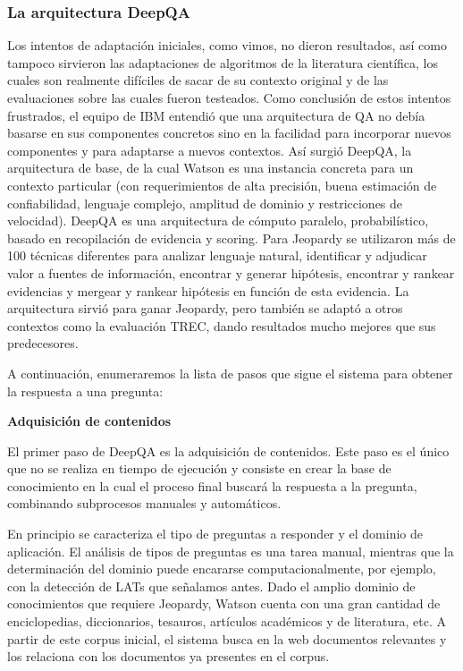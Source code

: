 \subsubsection*{La arquitectura DeepQA}
\label{subsec:deep-qa}
Los intentos de adaptación iniciales, como vimos, no dieron resultados, así como tampoco sirvieron las adaptaciones de algoritmos de la literatura científica, los cuales son realmente difíciles de
sacar de su contexto original y de las evaluaciones sobre las cuales fueron testeados. Como conclusión de estos intentos frustrados, el equipo de IBM entendió que una arquitectura de QA no debía basarse en sus componentes concretos sino en la facilidad para incorporar nuevos componentes y para adaptarse a nuevos contextos. Así surgió DeepQA, la arquitectura de base, de la cual Watson es una instancia concreta para un contexto particular (con requerimientos de alta precisión, buena estimación de confiabilidad, lenguaje complejo, amplitud de dominio y restricciones de velocidad). DeepQA es una arquitectura de cómputo paralelo, probabilístico, basado en recopilación de evidencia y scoring. Para Jeopardy se utilizaron más de 100 técnicas diferentes para analizar lenguaje natural, identificar y adjudicar valor a fuentes de información, encontrar y generar hipótesis, encontrar y rankear evidencias y mergear y rankear hipótesis en función de esta evidencia. La arquitectura sirvió para ganar Jeopardy, pero también se adaptó a otros contextos como la evaluación TREC, dando resultados mucho mejores que sus predecesores. 
\medskip

A continuación, enumeraremos la lista de pasos que sigue el sistema para obtener la respuesta a una pregunta: \newline

\textbf{Adquisición de contenidos} \newline

El primer paso de DeepQA es la adquisición de contenidos. Este paso es
el único que no se realiza en tiempo de ejecución y consiste en
crear la base de conocimiento en la cual el proceso final buscará la
respuesta a la pregunta, combinando subprocesos manuales y
automáticos. 

En principio se caracteriza el tipo de preguntas a responder y el
dominio de aplicación. El análisis de tipos de preguntas es una
tarea manual, mientras que la determinación del dominio puede
encararse computacionalmente, por ejemplo, con la detección de LATs
que señalamos antes. Dado el amplio dominio de conocimientos que
requiere Jeopardy, Watson cuenta con una gran cantidad de
enciclopedias, diccionarios, tesauros, artículos académicos y de
literatura, etc. A partir de este corpus inicial, el sistema busca en
la web documentos relevantes y los relaciona con los documentos ya
presentes en el corpus. 

